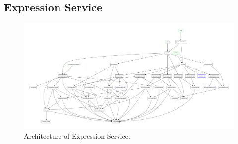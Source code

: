 \begin{chapterBody}
\chapter{Expression Service}

\begin{landscape}
\begin{figure}[ht]
    \centering
    \includegraphics[width=\linewidth]{res/2/expr_serv_dep_graph.pdf}
    \caption{Architecture of Expression Service.}
    \label{fig:bg-es-arch}
\end{figure}
\end{landscape}

\end{chapterBody}